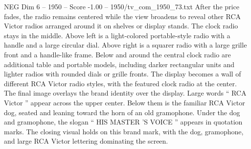 \begin{textsample}{NEG Dim 6 – 1950 – Score -1.00 – 1950/tv\_com\_1950\_73.txt}
After the price fades, the radio remains centered while the view broadens to reveal other RCA Victor radios arranged around it on shelves or display stands.
The clock radio stays in the middle.
Above left is a light-colored portable-style radio with a handle and a large circular dial.
Above right is a squarer radio with a large grille front and a handle-like frame.
Below and around the central clock radio are additional table and portable models, including darker rectangular units and lighter radios with rounded dials or grille fronts.
The display becomes a wall of different RCA Victor radio styles, with the featured clock radio at the center.
The final image overlays the brand identity over the display.
Large words “ RCA Victor ” appear across the upper center.
Below them is the familiar RCA Victor dog, seated and leaning toward the horn of an old gramophone.
Under the dog and gramophone, the slogan “ HIS MASTER ’S VOICE ” appears in quotation marks.
The closing visual holds on this brand mark, with the dog, gramophone, and large RCA Victor lettering dominating the screen.

\end{textsample}
